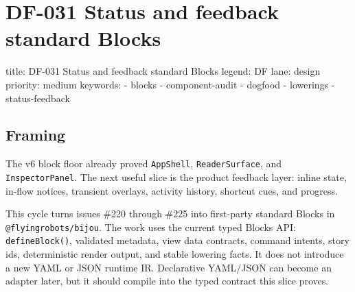 \chapter{DF-031 Status and feedback standard Blocks}\label{record-092}

\smallskip

\begin{RecordMeta}
title: DF-031 Status and feedback standard Blocks
legend: DF
lane: design
priority: medium
keywords:
  - blocks
  - component-audit
  - dogfood
  - lowerings
  - status-feedback

\end{RecordMeta}

\section{Framing}\label{record-092-framing}

The v6 block floor already proved \texttt{A\allowbreak{}p\allowbreak{}p\allowbreak{}S\allowbreak{}h\allowbreak{}e\allowbreak{}l\allowbreak{}l}, \texttt{R\allowbreak{}e\allowbreak{}a\allowbreak{}d\allowbreak{}e\allowbreak{}r\allowbreak{}S\allowbreak{}u\allowbreak{}r\allowbreak{}f\allowbreak{}a\allowbreak{}c\allowbreak{}e}, and \texttt{I\allowbreak{}n\allowbreak{}s\allowbreak{}p\allowbreak{}e\allowbreak{}c\allowbreak{}t\allowbreak{}o\allowbreak{}r\allowbreak{}P\allowbreak{}a\allowbreak{}n\allowbreak{}e\allowbreak{}l}. The next useful slice is the product feedback layer: inline state, in-flow notices, transient overlays, activity history, shortcut cues, and progress.

This cycle turns issues \#220 through \#225 into first-party standard Blocks in \texttt{@\allowbreak{}f\allowbreak{}l\allowbreak{}y\allowbreak{}i\allowbreak{}n\allowbreak{}g\allowbreak{}r\allowbreak{}o\allowbreak{}b\allowbreak{}o\allowbreak{}t\allowbreak{}s\allowbreak{}/\allowbreak{}b\allowbreak{}i\allowbreak{}j\allowbreak{}o\allowbreak{}u}. The work uses the current typed Blocks API: \texttt{d\allowbreak{}e\allowbreak{}f\allowbreak{}i\allowbreak{}n\allowbreak{}e\allowbreak{}B\allowbreak{}l\allowbreak{}o\allowbreak{}c\allowbreak{}k\allowbreak{}(\allowbreak{})}, validated metadata, view data contracts, command intents, story ids, deterministic render output, and stable lowering facts. It does not introduce a new YAML or JSON runtime IR. Declarative YAML/JSON can become an adapter later, but it should compile into the typed contract this slice proves.

